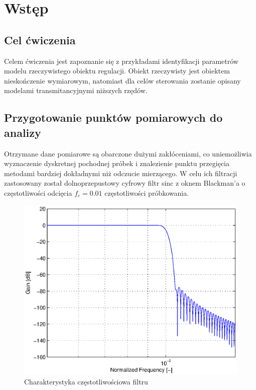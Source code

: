\documentclass[12pt]{article}
\begin{document}
 
 

\section{Wstęp}

\subsection{Cel ćwiczenia} 

Celem ćwiczenia jest zapoznanie się z przykładami identyfikacji parametrów modelu rzeczywistego obiektu 
regulacji. Obiekt rzeczywisty jest obiektem nieskończenie wymiarowym, natomiast dla celów sterowania 
zostanie opisany modelami transmitancyjnymi niższych rzędów. 


\subsection{Przygotowanie punktów pomiarowych do analizy}

Otrzymane dane pomiarowe są obarczone dużymi zakłóceniami, co uniemożliwia
wyznaczenie dyskretnej pochodnej próbek i znalezienie punktu przegięcia metodami
bardziej dokładnymi niż odczucie mierzącego. W celu ich filtracji zastosowany
został dolnoprzepustowy cyfrowy filtr sinc z oknem Blackman'a o częstotliwości
odcięcia $f_c=0.01$ częstotliwości próbkowania.

\begin{figure}[!htp]
	\begin{center}
		\includegraphics[width=13cm]{../res/img/filresp.eps}
	\end{center} 
	\caption{Charakterystyka częstotliwościowa filtru}
\end{figure}
\end{document}
